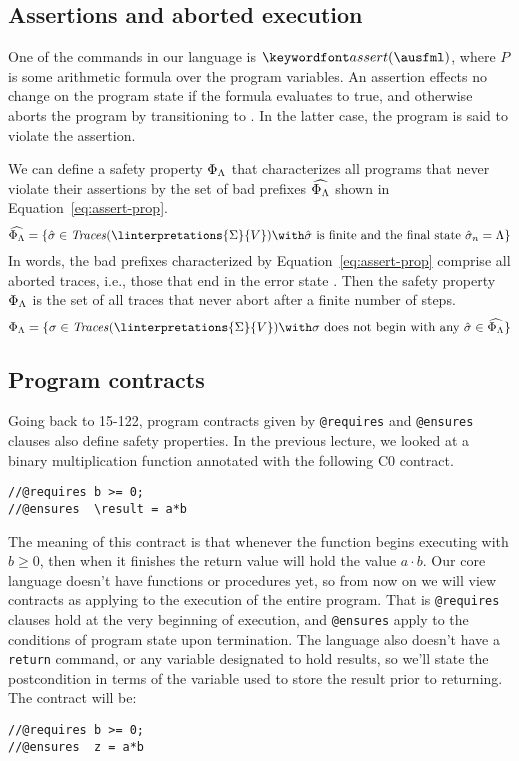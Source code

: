 \documentclass[11pt,twoside]{scrartcl}
\begin{document}
\subsection{Assertions and aborted execution}

One of the commands in our language is $\passert{\ausfml}$, where $P$ is some arithmetic formula over the program variables. An assertion effects no change on the program state if the formula evaluates to true, and otherwise aborts the program by transitioning to \errstate. In the latter case, the program is said to violate the assertion.

We can define a safety property $\Phi_\Lambda$ that characterizes all programs that never violate their assertions by the set of bad prefixes $\widehat{\Phi_\Lambda}$ shown in Equation~\ref{eq:assert-prop}.
\begin{equation}
\label{eq:assert-prop}
\widehat{\Phi_\errstate} = \{\hat{\atrace} \in \ttraces{\linterpretations{\Sigma}{V}} \with \hat{\atrace}~\text{is finite and the final state}~\hat{\atrace}_n = \errstate\}
\end{equation}
In words, the bad prefixes characterized by Equation~\ref{eq:assert-prop} comprise all aborted traces, i.e., those that end in the error state \errstate. Then the safety property $\Phi_\Lambda$ is the set of all traces that never abort after a finite number of steps.
\begin{equation}
\Phi_\errstate = \{\atrace \in \ttraces{\linterpretations{\Sigma}{V}} \with \atrace~\text{does not begin with any}~\hat{\atrace}\in\widehat{\Phi_\errstate}\}
\end{equation}

\subsection{Program contracts}

Going back to 15-122, program contracts given by \verb'@requires' and \verb'@ensures' clauses also define safety properties. In the previous lecture, we looked at a binary multiplication function annotated with the following C0 contract.
\begin{verbatim}
//@requires b >= 0;
//@ensures  \result = a*b
\end{verbatim}
The meaning of this contract is that whenever the function begins executing with $b \ge 0$, then when it finishes the return value will hold the value $a \cdot b$. Our core language doesn't have functions or procedures yet, so from now on we will view contracts as applying to the execution of the entire program. That is \verb'@requires' clauses hold at the very beginning of execution, and \verb'@ensures' apply to the conditions of program state upon termination. The language also doesn't have a \verb'return' command, or any variable designated to hold results, so we'll state the postcondition in terms of the variable used to store the result prior to returning. The contract will be:
\begin{verbatim}
//@requires b >= 0;
//@ensures  z = a*b
\end{verbatim}
\end{document}
